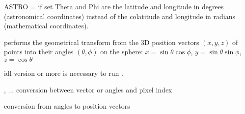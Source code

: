 \begin{keywords}
  \begin{kwlist}{} %
    \item[ASTRO =] if set Theta and Phi are the latitude and longitude in
    degrees (astronomical coordinates) instead of the colatitude and longitude
    in radians (mathematical coordinates).
  \end{kwlist}
\end{keywords}  

\begin{codedescription}
{\facname performs the geometrical transform from the 3D position vectors
$(x,y,z)$ of
points 
into their angles $(\theta,\phi)$ on the sphere:
$x = \sin\theta\cos\phi$, $y=\sin\theta\sin\phi$, $z=\cos\theta$}
\end{codedescription}



\begin{related}
  \begin{sulist}{} %
    \item[idl] version \idlversion or more is necessary to run \facname.	
    \item[\htmlref{pix2xxx}{idl:pix_tools}, ... ] conversion between vector or angles and pixel index
    \item[\htmlref{ang2vec}{idl:ang2vec}] conversion from angles to position vectors
  \end{sulist}
\end{related}

\begin{example}
{
\begin{tabular}{ll} %
\end{tabular}
}
{
}
\end{example}

